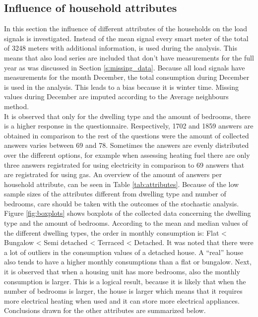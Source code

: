 \subsection{Influence of household attributes} \label{s:Identification of driving attributes}
In this section the influence of different attributes of the households on the load signals is investigated. Instead of the mean signal every smart meter of the total of 3248 meters with additional information, is used during the analysis. This means that also load series are included that don't have measurements for the full year as was discussed in Section \ref{s:missing_data}. Because all load signals have measurements for the month December, the total consumption during December is used in the analysis. This leads to a bias because it is winter time. Missing values during December are imputed according to the Average neighbours method.\\
It is observed that only for the dwelling type and the amount of bedrooms, there is a higher response in the questionnaire. Respectively, 1702 and 1859 answers are obtained in comparison to the rest of the questions were the amount of collected answers varies between 69 and 78. Sometimes the answers are evenly distributed over the different options, for example when assessing heating fuel there are only three answers registrated for using electricity in comparison to 69 answers that are registrated for using gas. An overview of the amount of answers per household attribute, can be seen in Table \ref{tab:attributes}. Because of the low sample sizes of the attributes different from dwelling type and number of bedrooms, care should be taken with the outcomes of the stochastic analysis.\\
Figure \ref{fig:boxplots} shows boxplots of the collected data concerning the dwelling type and the amount of bedrooms. According to the mean and median values of the different dwelling types, the order in monthly consumption is: Flat < Bungalow < Semi detached < Terraced < Detached. It was noted that there were a lot of outliers in the consumption values of a detached house. A ``real'' house also tends to have a higher monthly consumptions than a flat or bungalow. Next, it is observed that when a housing unit has more bedrooms, also the monthly consumption is larger. This is a logical result, because it is likely that when the number of bedrooms is larger, the house is larger which means that it requires more electrical heating when used and it can store more electrical appliances. Conclusions drawn for the other attributes are summarized below.

